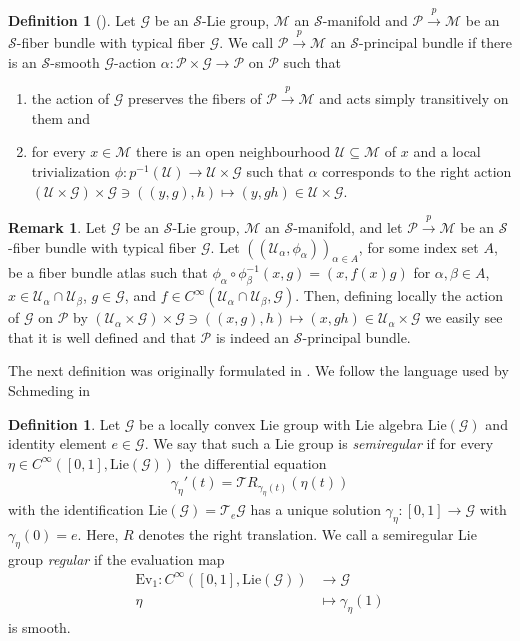 \documentclass[12pt,a4paper]{article}
\theoremstyle{plain}
\theoremstyle{definition}
\newtheorem{definition}[theorem]{Definition}
\newtheorem{remark}[theorem]{Remark}
\newcommand{\Ev}{\mathrm{Ev}}
\newcommand{\Mcal}{\mathcal{M}}
\newcommand{\Scal}{\mathcal{S}}
\newcommand{\Gcal}{\mathcal{G}}
\newcommand{\Ucal}{\mathcal{U}}
\newcommand{\Pcal}{\mathcal{P}}
\begin{document}
\begin{definition}[{\cite[Part I, Definition 4.6.5]{hamilton}}]
\label{Def:PrincBundle}
Let $\Gcal$ be an $\Scal$-Lie group, $\Mcal$ an $\Scal$-manifold and $\Pcal\xrightarrow{p} \Mcal$ be an $\Scal$-fiber bundle with typical fiber $\Gcal$.
We call $\Pcal\xrightarrow{p} \Mcal$ an $\Scal$-principal bundle if there is an $\Scal$-smooth $\Gcal$-action $\alpha:\Pcal\times\Gcal\to \Pcal$ on $\Pcal$ such that 
\begin{enumerate}
    \item the action of $\Gcal$ preserves the fibers of $\Pcal\xrightarrow{p}\Mcal$ and acts simply transitively on them and
    \item \label{item:LocalActionOfGonP} for every $x\in \Mcal$ there is an open neighbourhood $\Ucal\subseteq \Mcal$ of $x$ and a local trivialization $\phi:p^{-1}(\Ucal)\to\Ucal\times \Gcal$ such that $\alpha$ corresponds to the right action $(\Ucal\times\Gcal)\times \Gcal\ni((y,g),h)\mapsto (y,gh)\in \Ucal\times \Gcal$.
\end{enumerate}
\end{definition}

\begin{remark}
\label{Rem:PrincBundleViaTransFunct}
Let $\Gcal$ be an $\Scal$-Lie group, $\Mcal$ an $\Scal$-manifold, and let $\Pcal\xrightarrow{p} \Mcal$ be an $\Scal$-fiber bundle with typical fiber $\Gcal$. Let $((\Ucal_\alpha, \phi_\alpha))_{\alpha\in A}$, for some index set $A$, be a fiber bundle atlas such that $\phi_\alpha\circ \phi_\beta^{-1}(x,g)=(x,f(x)g)$ for $\alpha,\beta\in A$, $x\in \Ucal_\alpha \cap \Ucal_\beta$, $g\in \Gcal$, and $f\in C^\infty(\Ucal_\alpha\cap\Ucal_\beta, \Gcal)$. Then, defining locally the action of $\Gcal$ on $\Pcal$ by 
$(\Ucal_\alpha\times \Gcal)\times \Gcal\ni ((x,g),h)\mapsto (x,gh)\in  \Ucal_\alpha\times \Gcal$ we easily see that it is well defined and that $\Pcal$ is indeed an $\Scal$-principal bundle. 
\end{remark}


The next definition was originally formulated in \cite[Section 38]{ConvSetting}. We follow the language used by Schmeding in \cite[Definition 3.30]{schmeding_2022}
\begin{definition}
\label{Def:RegularLieGr}
Let $\Gcal$ be a locally convex Lie group with Lie algebra $\mathrm{Lie}(\Gcal)$ and identity element $e\in \Gcal$.
We say that such a Lie group is \textit{semiregular} if for every $\eta\in C^\infty([0,1],\mathrm{Lie}(\Gcal))$ the differential equation
\begin{align*}
    \gamma_\eta'(t)=\mathcal{T}R_{\gamma_\eta(t)}(\eta(t))           
\end{align*}
with the identification $\mathrm{Lie}(\Gcal)=\mathcal{T}_e\Gcal$ has a unique solution $\gamma_\eta:[0,1]\to \Gcal$ with $\gamma_\eta(0)=e$. Here, $R$ denotes the right translation.
We call a semiregular Lie group \textit{regular} if the evaluation map 
\begin{align*}
    \Ev_1:C^\infty([0,1],\mathrm{Lie}(\Gcal))&\to \Gcal\\
    \eta&\mapsto \gamma_\eta(1)
\end{align*}
is smooth.
\end{definition}
\end{document}
